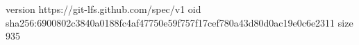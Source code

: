 version https://git-lfs.github.com/spec/v1
oid sha256:6900802c3840a0188fc4af47750e59f757f17cef780a43d80d0ac19e0c6e2311
size 935
